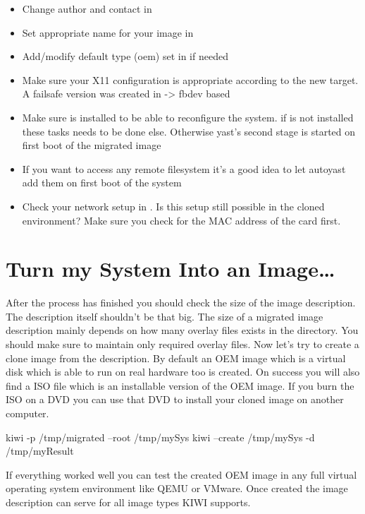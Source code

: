 \begin{itemize}
\item Change author and contact in 
\item Set appropriate name for your image in 
\item Add/modify default type (oem) set in  if needed
\item Make sure your X11 configuration is appropriate according to
      the new target. A failsafe version was created in
       -> fbdev based
\item Make sure  is installed to be able to reconfigure
      the system. if  is not installed these tasks needs to
      be done else. Otherwise yast's second stage is started on first
      boot of the migrated image
\item If you want to access any remote filesystem it's a good
      idea to let autoyast add them on first boot of the system
\item Check your network setup in . Is this
      setup still possible in the cloned environment? Make sure you
      check for the MAC address of the card first.
\end{itemize}

\section{Turn my System Into an Image\ldots}
After the process has finished you should check the size of the
image description. The description itself shouldn't be that big.
The size of a migrated image description mainly depends on how many
overlay files exists in the  directory. You should make
sure to maintain only required overlay files. Now let's try to create a
clone image from the description. By default an OEM image which is
a virtual disk which is able to run on real hardware too is created.
On success you will also find a ISO file which is an installable
version of the OEM image. If you burn the ISO on a DVD you can use
that DVD to install your cloned image on another computer.

\begin{Command}{8cm}
kiwi -p /tmp/migrated --root /tmp/mySys
kiwi --create /tmp/mySys -d /tmp/myResult
\end{Command}

If everything worked well you can test the created OEM
image in any full virtual operating system environment like QEMU or
VMware. Once created the image description can serve for all image
types KIWI supports.
 
